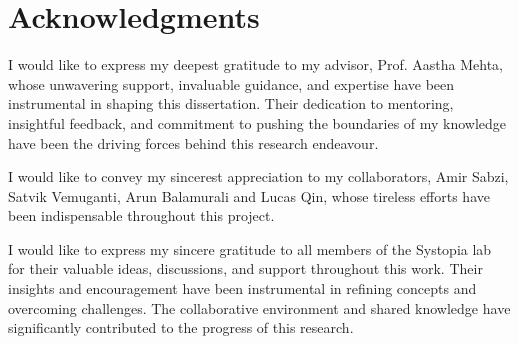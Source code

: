 
\chapter{Acknowledgments}

I would like to express my deepest gratitude to my advisor, Prof. Aastha Mehta, whose unwavering support, invaluable guidance, and expertise have been instrumental in shaping this dissertation.
Their dedication to mentoring, insightful feedback, and commitment to pushing the boundaries of my knowledge have been the driving forces behind this research endeavour. 

I would like to convey my sincerest appreciation to my collaborators, Amir Sabzi, Satvik Vemuganti, Arun Balamurali and Lucas Qin, whose tireless efforts have been indispensable throughout this project.

I would like to express my sincere gratitude to all members of the Systopia lab for their valuable ideas, discussions, and support throughout this work. Their insights and encouragement have been instrumental in refining concepts and overcoming challenges. The collaborative environment and shared knowledge have significantly contributed to the progress of this research.

\begin{comment}

I extend my heartfelt gratitude to Prof. Margo Seltzer for her invaluable contributions as a committee member for this dissertation.
Her extensive knowledge and keen insights have greatly enriched the depth and quality of this work.

\end{comment}
